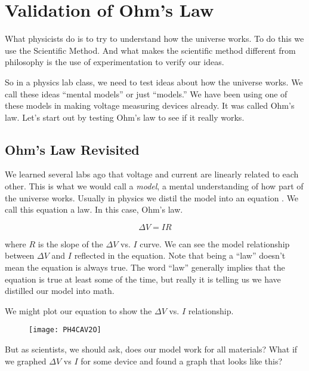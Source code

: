 \chapter{Validation of Ohm's Law}
\vspace{-0.25in}
What physicists do is to try to understand how the universe works. To do this we use the Scientific Method. And what makes the scientific method different from philosophy is the use of experimentation to verify our ideas.

So in a physics lab class, we need to test ideas about how the universe works. We call these ideas ``mental models'' or just ``models.'' We have been using one of these models in making voltage measuring devices already. It was called Ohm's law. Let's start out by testing Ohm's law to see if it really works.

\section{Ohm's Law Revisited}

We learned several labs ago that voltage and current are linearly related to each other. This is what we would call a \emph{model}, a mental understanding of how part of the universe works. Usually in physics we distil the model into an equation . We call this equation a law. In this case, Ohm's law. 

\begin{equation*}
	\Delta V=IR
\end{equation*}

\noindent where $R$ is the slope of the $\Delta V$ vs. $I$ curve. We can see the model relationship between $\Delta V$ and $I$ reflected in the equation. Note that being a ``law'' doesn't mean the equation is always true. The word ``law'' generally implies that the equation is true at least some of the time, but really it is telling us we have distilled our model into math.

We might plot our equation to show the $\Delta V$ vs. $I$ relationship.

\begin{figure}[h!]
	\centering
	\texttt{[image: PH4CAV2O]}
\end{figure}



\noindent But as scientists, we should ask, does our model work for all materials? What if we graphed $\Delta V$ vs $I$ for some device and found a graph that looks like this?

